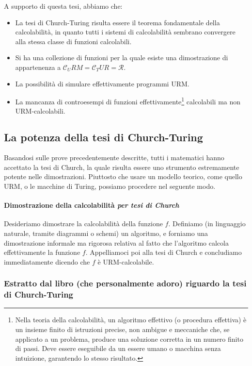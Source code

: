 	A supporto di questa tesi, abbiamo che:
	\begin{itemize}
		\item La tesi di Church-Turing risulta essere il teorema fondamentale della calcolabilità, in quanto tutti i sistemi di calcolabilità sembrano convergere alla stessa classe di funzioni calcolabili.
		\item Si ha una collezione di funzioni per la quale esiste una dimostrazione di appartenenza a $\mathcal{C}_URM = \mathcal{C}_TUR = \mathcal{R}$.
		\item La possibilità di simulare effettivamente programmi URM.
		\item La mancanza di controesempi di funzioni effettivamente\footnote{Nella teoria della calcolabilità, un algoritmo effettivo (o procedura effettiva) è un insieme finito di istruzioni precise, non ambigue e meccaniche che, se applicato a un problema, produce una soluzione corretta in un numero finito di passi. Deve essere eseguibile da un essere umano o macchina senza intuizione, garantendo lo stesso risultato.} calcolabili ma non URM-calcolabili.
	\end{itemize}
	
	\subsection{La potenza della tesi di Church-Turing}
	Basandosi sulle prove precedentemente descritte, tutti i matematici hanno accettato la tesi di Church, la quale risulta essere uno strumento estremamente potente nelle dimostrazioni. Piuttosto che usare un modello teorico, come quello URM, o le macchine di Turing, possiamo procedere nel seguente modo.
	
	\paragraph{Dimostrazione della calcolabilità \textit{per tesi di Church}} Desideriamo dimostrare la calcolabilità della funzione $f$. Definiamo (in linguaggio naturale, tramite diagrammi o schemi) un algoritmo, e forniamo una dimostrazione informale ma rigorosa relativa al fatto che l'algoritmo calcola effettivamente la funzione $f$. Appelliamoci poi alla tesi di Church e concludiamo immediatamente dicendo che $f$ è URM-calcolabile. 
	
	\subsubsection{Estratto dal libro (che personalmente adoro) riguardo la tesi di Church-Turing}

